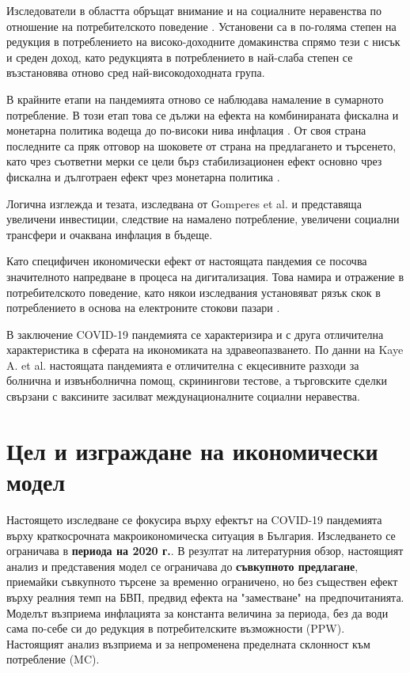 \documentclass[a4paper,12pt]{article}
\begin{document}
Изследователи в областта обръщат внимание и на социалните неравенства по отношение на потребителското поведение \cite{chettyEconomicImpactsCOVID19}. Установени са в по-голяма степен на редукция в потреблението на високо-доходните домакинства спрямо тези с нисък и среден доход, като редукцията в потреблението в най-слаба степен се възстановява отново сред най-високодоходната група. 

В крайните етапи на пандемията отново се наблюдава намаление в сумарното потребление. В този етап това се дължи на ефекта на комбинираната фискална и монетарна политика водеща до по-високи нива инфлация \cite{cavallo_inflation_2020-1}. От своя страна последните са пряк отговор на шоковете от страна на предлагането и търсенето, като чрез съответни мерки се цели бърз стабилизационен ефект основно чрез фискална и дълготраен ефект чрез монетарна политика \cite{zlatinov}.

Логична изглежда и тезата, изследвана от Gomperes et al. и представяща увеличени инвестиции, следствие на намалено потребление, увеличени социални трансфери и очаквана инфлация в бъдеще\cite{gompers_venture_2020-1}. 

Като специфичен икономически ефект от настоящата пандемия се посочва значителното напредване в процеса на дигитализация. Това намира и отражение в потребителското поведение, като някои изследвания установяват рязък скок в потреблението в основа на електроните стокови пазари \cite{sharma2020changing}.

В заключение COVID-19 пандемията се характеризира и с друга отличителна характеристика в сферата на икономиката на здравеопазването. По данни на Kaye A. et al. \cite{KAYE2021293} настоящата пандемията е отличителна с екцесивните разходи за болнична и извънболнична помощ, скринингови тестове, а търговските сделки свързани с ваксините засилват междунационалните социални неравества.  

\section{Цел и изграждане на икономически модел} 
Настоящето изследване се фокусира върху ефектът на COVID-19 пандемията върху краткосрочната макроикономическа ситуация в България. Изследването се ограничава в \textbf{периода на 2020 г.}. В резултат на литературния обзор, настоящият анализ и представения модел се ограничава до \textbf{съвкупното предлагане}, приемайки съвкупното търсене за временно ограничено, но без съществен ефект върху реалния темп на БВП, предвид ефекта на "заместване" на предпочитанията. Моделът възприема инфлацията за константа величина за периода, без да води сама по-себе си до редукция в потребителските възможности (PPW). Настоящият анализ възприема и за непроменена пределната склонност към потребление (MC).
\end{document}
